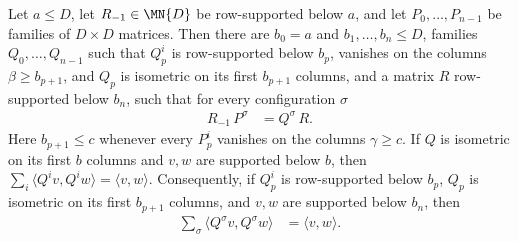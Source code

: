 \begin{lemma}
    \label{thm:seqanc_sweep_matrix_remainder}
    \leanok
    Let $a\le D$, let $R_{-1}\in\MN{D}$ be row-supported below $a$, and let
    $P_0,\dots,P_{n-1}$ be families of $D\times D$ matrices. Then there are
    $b_0=a$ and $b_1,\dots,b_n\le D$, families $Q_0,\dots,Q_{n-1}$ such that
    $Q_p^i$ is row-supported below $b_p$, vanishes on the columns
    $\beta\ge b_{p+1}$, and $Q_p$ is isometric on its first $b_{p+1}$ columns,
    and a matrix $R$ row-supported below $b_n$, such that for every
    configuration $\sigma$
    \begin{align}
        R_{-1}\,P^\sigma
         & =Q^\sigma\,R.
        \label{eq:seqanc_sweep_matrix_remainder}
    \end{align}
    Here $b_{p+1}\le c$ whenever every $P_p^i$ vanishes on the columns
    $\gamma\ge c$. If $Q$ is isometric on its first $b$ columns and $v,w$ are
    supported below $b$, then
    $\sum_i\langle Q^iv,Q^iw\rangle=\langle v,w\rangle$. Consequently, if
    $Q_p^i$ is row-supported below $b_p$, $Q_p$ is isometric on its first
    $b_{p+1}$ columns, and $v,w$ are supported below $b_n$, then
    \begin{align}
        \sum_\sigma\langle Q^\sigma v,Q^\sigma w\rangle
         & =\langle v,w\rangle.
        \label{eq:seqanc_sweep_inner_product}
    \end{align}
\end{lemma}
